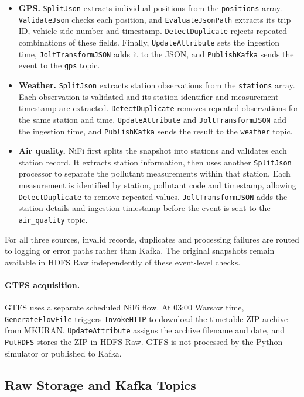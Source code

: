 \documentclass[11pt]{article}
\begin{document}
\begin{itemize}
    \item \textbf{GPS.} \texttt{SplitJson} extracts individual positions from the \texttt{positions} array. \texttt{ValidateJson} checks each position, and \texttt{EvaluateJsonPath} extracts its trip ID, vehicle side number and timestamp. \texttt{DetectDuplicate} rejects repeated combinations of these fields. Finally, \texttt{UpdateAttribute} sets the ingestion time, \texttt{JoltTransformJSON} adds it to the JSON, and \texttt{PublishKafka} sends the event to the \texttt{gps} topic.
    \item \textbf{Weather.} \texttt{SplitJson} extracts station observations from the \texttt{stations} array. Each observation is validated and its station identifier and measurement timestamp are extracted. \texttt{DetectDuplicate} removes repeated observations for the same station and time. \texttt{UpdateAttribute} and \texttt{JoltTransformJSON} add the ingestion time, and \texttt{PublishKafka} sends the result to the \texttt{weather} topic.
    \item \textbf{Air quality.} NiFi first splits the snapshot into stations and validates each station record. It extracts station information, then uses another \texttt{SplitJson} processor to separate the pollutant measurements within that station. Each measurement is identified by station, pollutant code and timestamp, allowing \texttt{DetectDuplicate} to remove repeated values. \texttt{JoltTransformJSON} adds the station details and ingestion timestamp before the event is sent to the \texttt{air\_quality} topic.
\end{itemize}

For all three sources, invalid records, duplicates and processing failures are routed to logging or error paths rather than Kafka. The original snapshots remain available in HDFS Raw independently of these event-level checks.

\paragraph{GTFS acquisition.}
GTFS uses a separate scheduled NiFi flow. At 03:00 Warsaw time, \texttt{GenerateFlowFile} triggers \texttt{InvokeHTTP} to download the timetable ZIP archive from MKURAN. \texttt{UpdateAttribute} assigns the archive filename and date, and \texttt{PutHDFS} stores the ZIP in HDFS Raw. GTFS is not processed by the Python simulator or published to Kafka.

\subsection{Raw Storage and Kafka Topics}
\end{document}
